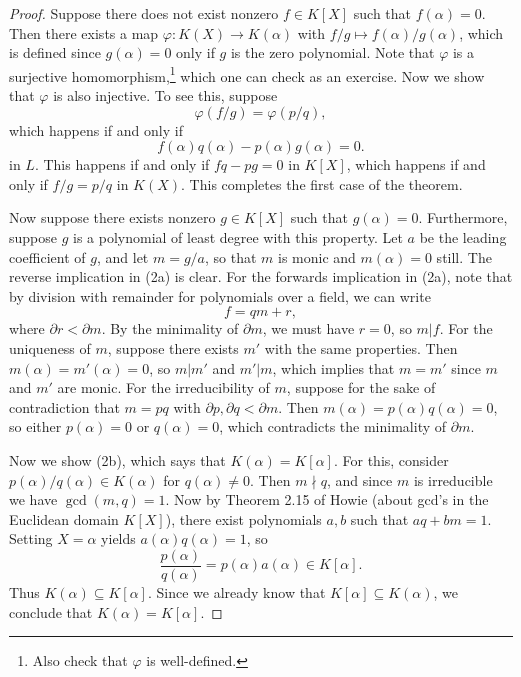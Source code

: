 \begin{proof}
  Suppose there does not exist nonzero $f \in K[X]$ such
  that $f(\alpha) = 0$. Then there exists a map
  $\varphi : K(X) \to K(\alpha)$ with
  $f / g \mapsto f(\alpha) / g(\alpha)$, which is
  defined since $g(\alpha) = 0$ only if $g$ is the
  zero polynomial. Note that $\varphi$ is a
  surjective homomorphism,\footnote{Also check that $\varphi$ is well-defined.} which one can check as
  an exercise. Now we show that $\varphi$ is also
  injective. To see this, suppose
  \[
    \varphi(f / g) = \varphi(p / q),
  \]
  which happens if and only if
  \[
    f(\alpha) q(\alpha) - p(\alpha) g(\alpha) = 0.
  \]
  in $L$. This happens if and only if $fq - pg = 0$
  in $K[X]$, which happens if and only if $f / g = p / q$
  in $K(X)$. This completes the first case of the theorem.

  Now suppose there exists nonzero $g \in K[X]$ such
  that $g(\alpha) = 0$. Furthermore, suppose $g$ is a
  polynomial of least degree with this property. Let
  $a$ be the leading coefficient of $g$, and let
  $m = g / a$, so that $m$ is monic and $m(\alpha) = 0$
  still. The reverse implication in (2a) is clear. For
  the forwards implication in (2a), note that by division
  with remainder for polynomials over a field, we can
  write
  \[
    f = qm + r,
  \]
  where $\partial r < \partial m$. By the minimality
  of $\partial m$, we must have $r = 0$, so $m | f$.
  For the uniqueness of $m$, suppose there exists $m'$
  with the same properties. Then
  $m(\alpha) = m'(\alpha) = 0$, so
  $m | m'$ and $m' | m$, which implies that $m = m'$
  since $m$ and $m'$ are monic. For the irreducibility
  of $m$, suppose for the sake of contradiction that
  $m = pq$ with $\partial p, \partial q < \partial m$.
  Then $m(\alpha) = p(\alpha) q(\alpha) = 0$, so
  either $p(\alpha) = 0$ or $q(\alpha) = 0$, which
  contradicts the minimality of $\partial m$.

  Now we show (2b), which says that
  $K(\alpha) = K[\alpha]$. For this, consider
  $p(\alpha) / q(\alpha) \in K(\alpha)$ for
  $q(\alpha) \ne 0$. Then $m {\nmid} q$, and since
  $m$ is irreducible we have $\gcd(m, q) = 1$. Now
  by Theorem 2.15 of Howie (about gcd's in the
  Euclidean domain $K[X]$), there exist polynomials
  $a, b$ such that $aq + bm = 1$. Setting
  $X = \alpha$ yields $a(\alpha) q(\alpha) = 1$, so
  \[
    \frac{p(\alpha)}{q(\alpha)} = p(\alpha) a(\alpha) \in K[\alpha].
  \]
  Thus $K(\alpha) \subseteq K[\alpha]$. Since we already
  know that $K[\alpha] \subseteq K(\alpha)$, we conclude
  that $K(\alpha) = K[\alpha]$.


\end{proof}
